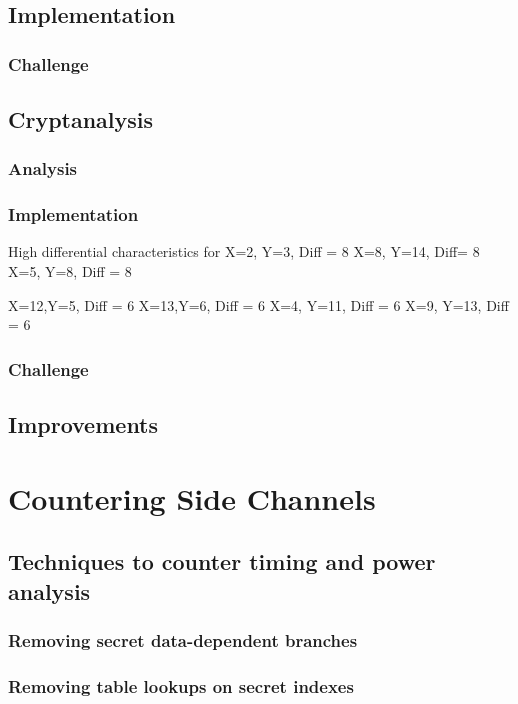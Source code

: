 \documentclass[british,11pt,a4paper]{article}
\begin{document}
\subsection{Implementation}

\subsubsection{Challenge}

\subsection{Cryptanalysis}
\subsubsection{Analysis}

\subsubsection{Implementation}
High differential characteristics for
X=2, Y=3, Diff = 8
X=8, Y=14, Diff= 8
X=5, Y=8, Diff = 8

X=12,Y=5, Diff = 6
X=13,Y=6, Diff = 6
X=4, Y=11, Diff = 6
X=9, Y=13, Diff = 6


\subsubsection{Challenge}

\subsection{Improvements}

\clearpage
\section{Countering Side Channels}
\subsection{Techniques to counter timing and power analysis}
\subsubsection{Removing secret data-dependent branches}
\subsubsection{Removing table lookups on secret indexes}
\end{document}
